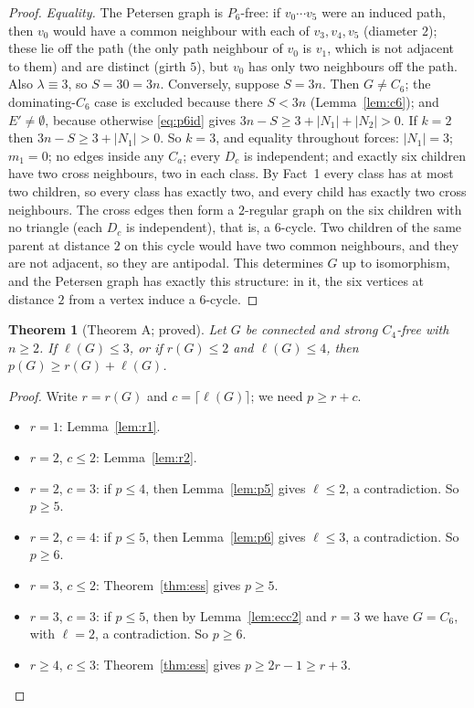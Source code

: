 \documentclass[11pt]{amsart}
\newtheorem{theorem}{Theorem}[section]
\theoremstyle{definition}
\theoremstyle{remark}
\newcommand{\lr}{\ell}
\newcommand{\pp}{p}
\begin{document}
\begin{proof}
\emph{Equality.} The Petersen graph is $P_6$-free: if $v_0\cdots v_5$ were an induced path, then $v_0$ would have a common neighbour with each of $v_3,v_4,v_5$ (diameter $2$); these lie off the path (the only path neighbour of $v_0$ is $v_1$, which is not adjacent to them) and are distinct (girth $5$), but $v_0$ has only two neighbours off the path. Also $\lambda\equiv3$, so $S=30=3n$. Conversely, suppose $S=3n$. Then $G\ne C_6$; the dominating-$C_6$ case is excluded because there $S<3n$ (Lemma~\ref{lem:c6}); and $E'\ne\emptyset$, because otherwise \eqref{eq:p6id} gives $3n-S\ge3+|N_1|+|N_2|>0$. If $k=2$ then $3n-S\ge3+|N_1|>0$. So $k=3$, and equality throughout forces: $|N_1|=3$; $m_1=0$; no edges inside any $C_a$; every $D_c$ is independent; and exactly six children have two cross neighbours, two in each class. By Fact~1 every class has at most two children, so every class has exactly two, and every child has exactly two cross neighbours. The cross edges then form a $2$-regular graph on the six children with no triangle (each $D_c$ is independent), that is, a $6$-cycle. Two children of the same parent at distance $2$ on this cycle would have two common neighbours, and they are not adjacent, so they are antipodal. This determines $G$ up to isomorphism, and the Petersen graph has exactly this structure: in it, the six vertices at distance $2$ from a vertex induce a $6$-cycle.
\end{proof}

\begin{theorem}[Theorem A; proved]\label{thm:A}
Let $G$ be connected and strong $C_4$-free with $n\ge2$. If $\lr(G)\le3$, or if $r(G)\le2$ and $\lr(G)\le4$, then $\pp(G)\ge r(G)+\lr(G)$.
\end{theorem}

\begin{proof}
Write $r=r(G)$ and $c=\lceil\lr(G)\rceil$; we need $\pp\ge r+c$.
\begin{itemize}
\item $r=1$: Lemma~\ref{lem:r1}.
\item $r=2$, $c\le2$: Lemma~\ref{lem:r2}.
\item $r=2$, $c=3$: if $\pp\le4$, then Lemma~\ref{lem:p5} gives $\lr\le2$, a contradiction. So $\pp\ge5$.
\item $r=2$, $c=4$: if $\pp\le5$, then Lemma~\ref{lem:p6} gives $\lr\le3$, a contradiction. So $\pp\ge6$.
\item $r=3$, $c\le2$: Theorem~\ref{thm:ess} gives $\pp\ge5$.
\item $r=3$, $c=3$: if $\pp\le5$, then by Lemma~\ref{lem:ecc2} and $r=3$ we have $G=C_6$, with $\lr=2$, a contradiction. So $\pp\ge6$.
\item $r\ge4$, $c\le3$: Theorem~\ref{thm:ess} gives $\pp\ge2r-1\ge r+3$. \qedhere
\end{itemize}
\end{proof}
\end{document}

